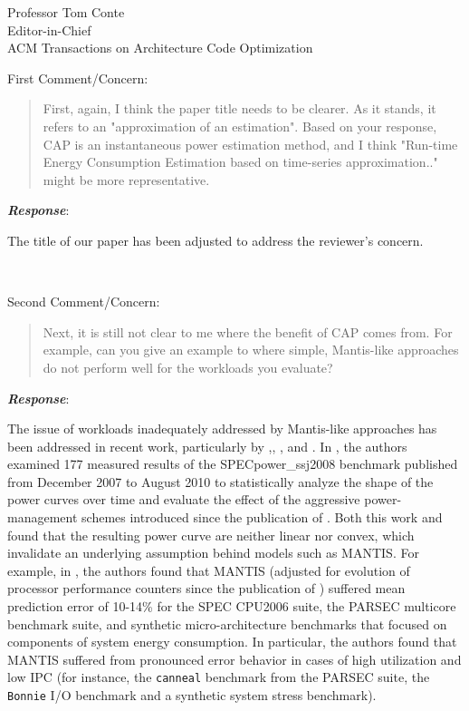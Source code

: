 \documentclass[10pt]{letter} %
\newenvironment{rviewcomment}
{~\\%
\begin{bfseries}}
{\end{bfseries}}
\newcommand{\rviewresponse}{\textbf{\textit{Response}}:}
\begin{document}
\begin{letter}{Professor Tom Conte \\
Editor-in-Chief \\
ACM Transactions on Architecture Code Optimization }
\begin{rviewcomment}
  First Comment/Concern:
\end{rviewcomment}
\begin{quote}
\begin{itshape} 
  First, again, I think the paper title needs to be clearer. As it
  stands, it refers to an "approximation of an estimation". Based on
  your response, CAP is an instantaneous power estimation method, and I
  think "Run-time Energy Consumption Estimation based on time-series
  approximation.." might be more representative.
\end{itshape}
\end{quote}

\rviewresponse

The title of our paper has been adjusted to address the reviewer's
concern.

\begin{rviewcomment}
  Second Comment/Concern:
\end{rviewcomment}
\begin{quote}
  \begin{itshape}
    Next, it is still not clear to me where the benefit of CAP comes
    from. For example, can you give an example to where simple,
    Mantis-like approaches do not perform well for the workloads you
    evaluate? 
  \end{itshape}
\end{quote}
\rviewresponse 

The issue of workloads inadequately addressed by Mantis-like approaches
has been addressed in recent work, particularly by
\cite{Varsampoulos2010},\cite{Kansal2010}, \cite{Hsu2011}, and
\cite{McCullough2011}. In \cite{Hsu2011}, the authors examined 177
measured results of the SPECpower\_ssj2008 benchmark published from
December 2007 to August 2010 to statistically analyze the shape of the
power curves over time and evaluate the effect of the aggressive
power-management schemes introduced since the publication of
\cite{Economou2006}. Both this work and \cite{Varsampoulos2010} found
that the resulting power curve are neither linear nor convex, which
invalidate an underlying assumption behind models such as MANTIS.  For
example, in \cite{McCullough2011}, the authors found that MANTIS
(adjusted for evolution of processor performance counters since the
publication of \cite{Economou2006}) suffered mean prediction error of
10-14\% for the SPEC CPU2006 suite, the PARSEC multicore benchmark
suite, and synthetic micro-architecture benchmarks that focused on
components of system energy consumption.  In particular, the authors
found that MANTIS suffered from pronounced error behavior in cases of
high utilization and low IPC (for instance, the \texttt{canneal}
benchmark from the PARSEC suite, the \texttt{Bonnie} I/O benchmark and a
synthetic system stress benchmark).


\end{letter}
\end{document}
